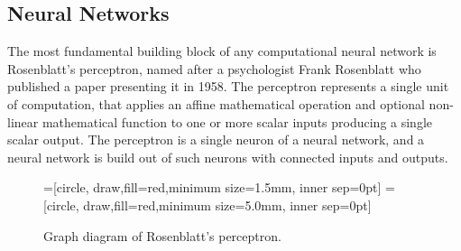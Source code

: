 \documentclass[english, 12pt, a4paper, elec, utf8, online]{aaltothesis}
\begin{document}
\subsection{Neural Networks\label{sub:nn}}
The most fundamental building block of any computational neural network is Rosenblatt's perceptron, named after a psychologist Frank Rosenblatt who published a paper presenting it in 1958. The perceptron represents a single unit of computation, that applies an affine mathematical operation and optional non-linear mathematical function to one or more scalar inputs producing a single scalar output. The perceptron is a single neuron of a neural network, and a neural network is build out of such neurons with connected inputs and outputs.~\cite{haykin2009neural} 
\usetikzlibrary{arrows,decorations.markings}
\begin{figure}[h!]
\centering
{}=[circle, draw,fill=red,minimum size=1.5mm, inner sep=0pt]
=[circle, draw,fill=red,minimum size=5.0mm, inner sep=0pt]
\caption{Graph diagram of Rosenblatt's perceptron. }\label{fig:graph_perceptron}
\end{figure}
\end{document}
